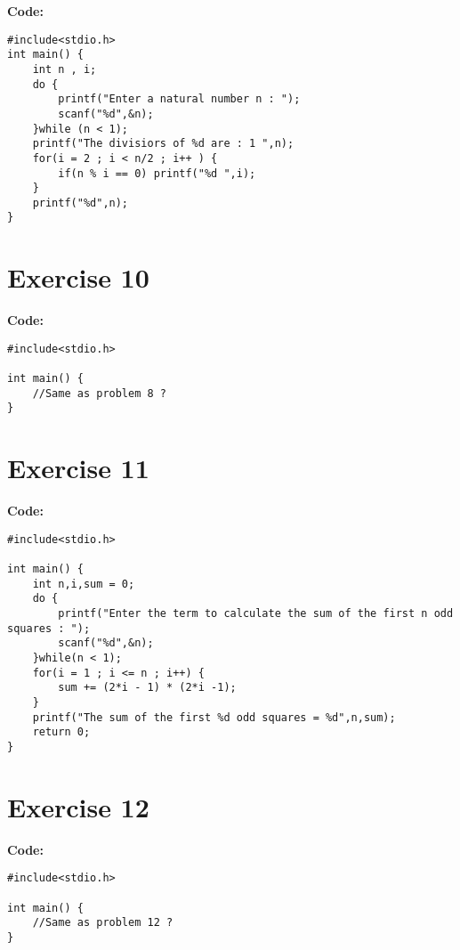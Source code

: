 \documentclass[12pt]{article}
\begin{document}
	\textbf{Code:}
\begin{lstlisting}
#include<stdio.h>
int main() {
    int n , i;
    do {
        printf("Enter a natural number n : ");
        scanf("%d",&n);
    }while (n < 1);
    printf("The divisiors of %d are : 1 ",n);
    for(i = 2 ; i < n/2 ; i++ ) {
        if(n % i == 0) printf("%d ",i); 
    }
    printf("%d",n);
}
\end{lstlisting}
	\vspace{1cm}
\newpage
	\section*{Exercise 10}
	\vspace{0.5cm}
	
	\textbf{Code:}
\begin{lstlisting}
#include<stdio.h>

int main() {
    //Same as problem 8 ? 
}
\end{lstlisting}
	\vspace{1cm}
	
	\section*{Exercise 11}
	\vspace{0.5cm}
	
	\textbf{Code:}
\begin{lstlisting}
#include<stdio.h>

int main() {
    int n,i,sum = 0;
    do {
        printf("Enter the term to calculate the sum of the first n odd squares : ");
        scanf("%d",&n);
    }while(n < 1);
    for(i = 1 ; i <= n ; i++) {
        sum += (2*i - 1) * (2*i -1);
    }
    printf("The sum of the first %d odd squares = %d",n,sum);
    return 0;
}
\end{lstlisting}
	\vspace{1cm}
	
	\section*{Exercise 12}
	\vspace{0.5cm}
	
	\textbf{Code:}
\begin{lstlisting}
#include<stdio.h>

int main() {
    //Same as problem 12 ?
}
\end{lstlisting}
	\vspace{1cm}
	
\end{document}
